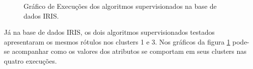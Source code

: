 \begin{figure}[h!]
    \centering
    \quad
    
    \caption{Gráfico de Execuções dos algoritmos supervisionados na base de dados IRIS.} \label{fig:graf:IRIS_NB_CART}
        
\end{figure}

Já na base de dados IRIS, os dois algoritmos supervisionados testados apresentaram os mesmos rótulos nos clusters 1 e 3. Nos gráficos da figura \ref{fig:graf:IRIS_NB_CART} pode-se acompanhar como os valores dos atributos se comportam em seus clusters nas quatro execuções.


